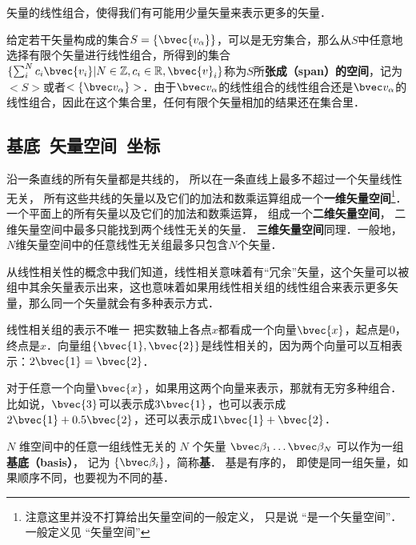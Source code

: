 





矢量的线性组合，使得我们有可能用少量矢量来表示更多的矢量．

给定若干矢量构成的集合$S=\{\bvec{v_\alpha}\}$，可以是无穷集合，那么从$S$中任意地选择有限个矢量进行线性组合，所得到的集合$\{\sum_i^N c_i\bvec{v_i}|N\in\mathbb{Z}, c_i\in\mathbb{R}, \bvec{v}_i\}$称为$S$所\textbf{张成（span）的空间}，记为$<S>$或者$<\{\bvec v_\alpha\}>$．由于$\bvec v_\alpha$的线性组合的线性组合还是$\bvec v_\alpha$的线性组合，因此在这个集合里，任何有限个矢量相加的结果还在集合里．



\subsection{基底\ 矢量空间\ 坐标}
沿一条直线的所有矢量都是共线的， 所以在一条直线上最多不超过一个矢量线性无关， 所有这些共线的矢量以及它们的加法和数乘运算组成一个\textbf{一维矢量空间}\footnote{注意这里并没不打算给出矢量空间的一般定义， 只是说 “是一个矢量空间”． 一般定义见 “矢量空间”}． 一个平面上的所有矢量以及它们的加法和数乘运算， 组成一个\textbf{二维矢量空间}， 二维矢量空间中最多只能找到两个线性无关的矢量． \textbf{三维矢量空间}同理．一般地，$N$维矢量空间中的任意线性无关组最多只包含$N$个矢量．

从线性相关性的概念中我们知道，线性相关意味着有“冗余”矢量，这个矢量可以被组中其余矢量表示出来，这也意味着如果用线性相关组的线性组合来表示更多矢量，那么同一个矢量就会有多种表示方式．

\begin{example}{线性相关组的表示不唯一}
把实数轴上各点$x$都看成一个向量$\bvec{x}$，起点是$0$，终点是$x$．向量组$\{\bvec{1}, \bvec{2}\}$是线性相关的，因为两个向量可以互相表示：$2\bvec{1}=\bvec{2}$．

对于任意一个向量$\bvec{x}$，如果用这两个向量来表示，那就有无穷多种组合．比如说，$\bvec{3}$可以表示成$3\bvec{1}$，也可以表示成$2\bvec{1}+0.5\bvec{2}$，还可以表示成$1\bvec{1}+\bvec{2}$．
\end{example}

$N$ 维空间中的任意一组线性无关的 $N$ 个矢量 $\bvec \beta_1\dots \bvec \beta_N$ 可以作为一组\textbf{基底（basis）}， 记为 $\{\bvec \beta_i\}$，简称\textbf{基}． 基是有序的， 即使是同一组矢量，如果顺序不同，也要视为不同的基． 

